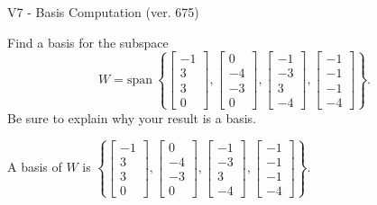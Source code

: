 \begin{exercise}
  \begin{exerciseTitle}V7 - Basis Computation (ver. 675)\end{exerciseTitle}
  \begin{exerciseStatement}
    Find a basis for the subspace 
\[W=\mathrm{span}\ \left\{\left[\begin{array}{r}
-1 \\
3 \\
3 \\
0
\end{array}\right] , \left[\begin{array}{r}
0 \\
-4 \\
-3 \\
0
\end{array}\right] , \left[\begin{array}{r}
-1 \\
-3 \\
3 \\
-4
\end{array}\right] , \left[\begin{array}{r}
-1 \\
-1 \\
-1 \\
-4
\end{array}\right]\right\}.\]
 Be sure to explain why your result is a basis.


  \end{exerciseStatement}
  \begin{exerciseAnswer}
   A basis of \(W\) is  \(\left\{\left[\begin{array}{r}
-1 \\
3 \\
3 \\
0
\end{array}\right] , \left[\begin{array}{r}
0 \\
-4 \\
-3 \\
0
\end{array}\right] , \left[\begin{array}{r}
-1 \\
-3 \\
3 \\
-4
\end{array}\right] , \left[\begin{array}{r}
-1 \\
-1 \\
-1 \\
-4
\end{array}\right]\right\}\).
  


  \end{exerciseAnswer}
\end{exercise}
